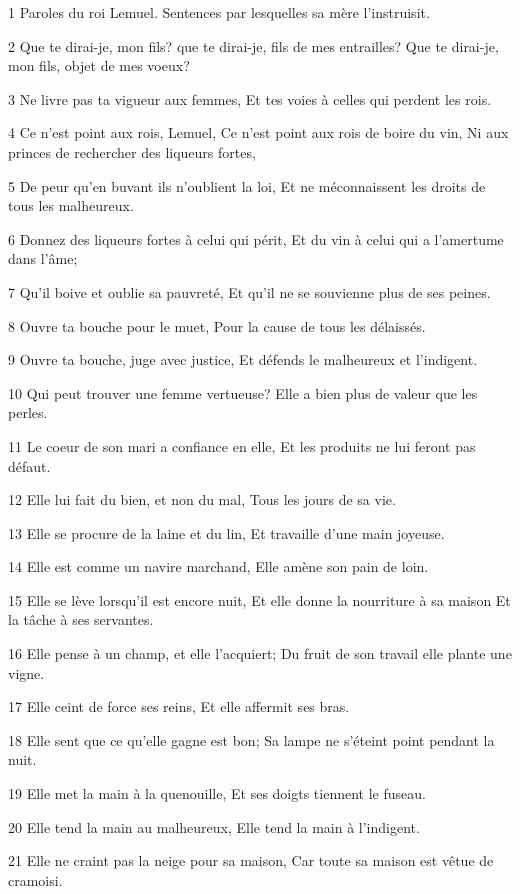 \par 1 Paroles du roi Lemuel. Sentences par lesquelles sa mère l'instruisit.
\par 2 Que te dirai-je, mon fils? que te dirai-je, fils de mes entrailles? Que te dirai-je, mon fils, objet de mes voeux?
\par 3 Ne livre pas ta vigueur aux femmes, Et tes voies à celles qui perdent les rois.
\par 4 Ce n'est point aux rois, Lemuel, Ce n'est point aux rois de boire du vin, Ni aux princes de rechercher des liqueurs fortes,
\par 5 De peur qu'en buvant ils n'oublient la loi, Et ne méconnaissent les droits de tous les malheureux.
\par 6 Donnez des liqueurs fortes à celui qui périt, Et du vin à celui qui a l'amertume dans l'âme;
\par 7 Qu'il boive et oublie sa pauvreté, Et qu'il ne se souvienne plus de ses peines.
\par 8 Ouvre ta bouche pour le muet, Pour la cause de tous les délaissés.
\par 9 Ouvre ta bouche, juge avec justice, Et défends le malheureux et l'indigent.
\par 10 Qui peut trouver une femme vertueuse? Elle a bien plus de valeur que les perles.
\par 11 Le coeur de son mari a confiance en elle, Et les produits ne lui feront pas défaut.
\par 12 Elle lui fait du bien, et non du mal, Tous les jours de sa vie.
\par 13 Elle se procure de la laine et du lin, Et travaille d'une main joyeuse.
\par 14 Elle est comme un navire marchand, Elle amène son pain de loin.
\par 15 Elle se lève lorsqu'il est encore nuit, Et elle donne la nourriture à sa maison Et la tâche à ses servantes.
\par 16 Elle pense à un champ, et elle l'acquiert; Du fruit de son travail elle plante une vigne.
\par 17 Elle ceint de force ses reins, Et elle affermit ses bras.
\par 18 Elle sent que ce qu'elle gagne est bon; Sa lampe ne s'éteint point pendant la nuit.
\par 19 Elle met la main à la quenouille, Et ses doigts tiennent le fuseau.
\par 20 Elle tend la main au malheureux, Elle tend la main à l'indigent.
\par 21 Elle ne craint pas la neige pour sa maison, Car toute sa maison est vêtue de cramoisi.
